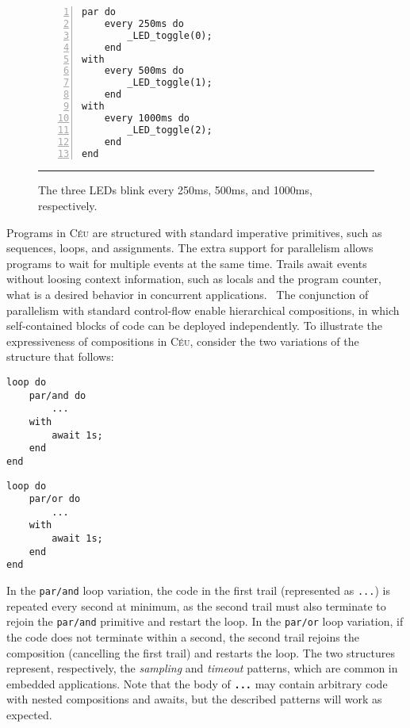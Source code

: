 \documentclass{llncs}
\newcommand{\CEU}{\textsc{C\'{e}u}\xspace}
\newcommand{\code}[1] {{\small{\texttt{#1}}}}
\begin{document}
\begin{figure}[h]
\begin{lstlisting}[numbers=left,xleftmargin=2em]
par do
    every 250ms do
        _LED_toggle(0);
    end
with
    every 500ms do
        _LED_toggle(1);
    end
with
    every 1000ms do
        _LED_toggle(2);
    end
end
\end{lstlisting}
\rule{12.2cm}{0.37pt}
\caption{
    The three LEDs blink every 250ms, 500ms, and 1000ms, respectively.
    \label{lst.TODO}
}
\end{figure}

Programs in \CEU are structured with standard imperative primitives, such as 
sequences, loops, and assignments.
The extra support for parallelism allows programs to wait for multiple events 
at the same time.
Trails await events without loosing context information, such as locals and the 
program counter, what is a desired behavior in concurrent 
applications.~\cite{sync_async.cooperative}
%
The conjunction of parallelism with standard control-flow enable hierarchical 
compositions, in which self-contained blocks of code can be deployed 
independently.
%
To illustrate the expressiveness of compositions in \CEU, consider the two 
variations of the structure that follows:

\begin{minipage}[t]{0.35\linewidth}
\begin{lstlisting}
loop do
    par/and do
        ...
    with
        await 1s;
    end
end
\end{lstlisting}
\end{minipage}
%
\hspace{1cm}
%
\begin{minipage}[t]{0.35\linewidth}
\begin{lstlisting}
loop do
    par/or do
        ...
    with
        await 1s;
    end
end
\end{lstlisting}
\end{minipage}

In the \code{par/and} loop variation, the code in the first trail (represented 
as \code{...}) is repeated every second at minimum, as the second trail must 
also terminate to rejoin the \code{par/and} primitive and restart the loop.
%
In the \code{par/or} loop variation, if the code does not terminate within a 
second, the second trail rejoins the composition (cancelling the first trail) 
and restarts the loop.
%
The two structures represent, respectively, the \emph{sampling} and 
\emph{timeout} patterns, which are common in embedded applications.
%
Note that the body of \textbf{\code{...}} may contain arbitrary code with 
nested compositions and awaits, but the described patterns will work as 
expected.
\end{document}
